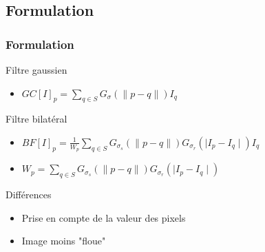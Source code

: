 \documentclass[compress]{beamer}
\begin{document}
\subsection{Formulation}
\begin{frame}\frametitle{Formulation}
	\begin{block}{Filtre gaussien}
		\begin{itemize}
			\item $GC[I]_p = \sum_{q\in S}G_{\sigma}(\parallel p-q \parallel ) I_q  $
		\end{itemize}		
	\end{block}
\pause	
	\begin{block}{Filtre bilatéral}
		\begin{itemize}
			\item $BF[I]_p = \frac{1}{W_p}\sum_{q\in S} G_{\sigma_s}(\parallel p- q \parallel)G_{\sigma_r}(\mid I_p - I_q \mid) I_q$ 
			\item $W_p = \sum_{q\in S} G_{\sigma_s}(\parallel p- q \parallel)G_{\sigma_r}(\mid I_p - I_q \mid)$
		\end{itemize}
	\end{block}	
\pause	
	\begin{block}{Différences}
		\begin{itemize}
			\item Prise en compte de la valeur des pixels
			\item Image moins "floue"
		\end{itemize}
	\end{block}
	
\end{frame}
\end{document}
